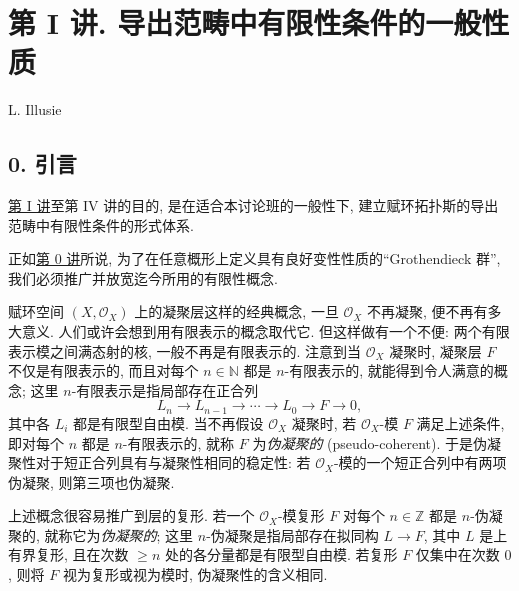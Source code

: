 \providecommand{\sgaIHom}{\underline{\operatorname{Hom}}}
\providecommand{\sgaIRHom}{\mathrm R\!\underline{\operatorname{Hom}}}
\providecommand{\sgaIGRHom}{\mathrm R\!\operatorname{Hom}}
\providecommand{\sgaIExt}{\underline{\operatorname{Ext}}}
\providecommand{\sgaIParff}{\underline{\mathrm{parf}}}
\providecommand{\sgaIS}{\underline S}
\providecommand{\otL}{\mathop{\otimes}^{\mathrm L}}
\section*{第 I 讲. 导出范畴中有限性条件的一般性质}
\begin{center}
L. Illusie
\end{center}

\subsection*{0. 引言}
\hyperlink{sga6.e01.expose}{第 I 讲}至第 IV 讲的目的, 是在适合本讨论班的一般性下, 建立赋环拓扑斯的导出范畴中有限性条件的形式体系.

正如\hyperlink{sga6.e00.expose}{第 0 讲}所说, 为了在任意概形上定义具有良好变性性质的“Grothendieck 群”, 我们必须推广并放宽迄今所用的有限性概念.

赋环空间 \((X,\mathcal O_X)\) 上的凝聚层这样的经典概念, 一旦 \(\mathcal O_X\) 不再凝聚, 便不再有多大意义. 人们或许会想到用有限表示的概念取代它. 但这样做有一个不便: 两个有限表示模之间满态射的核, 一般不再是有限表示的. 注意到当 \(\mathcal O_X\) 凝聚时, 凝聚层 \(F\) 不仅是有限表示的, 而且对每个 \(n\in\mathbb N\) 都是 \(n\)-有限表示的, 就能得到令人满意的概念; 这里 \(n\)-有限表示是指局部存在正合列
\[
  L_n\longrightarrow L_{n-1}\longrightarrow \cdots \longrightarrow L_0\longrightarrow F\longrightarrow 0,
\]
其中各 \(L_i\) 都是有限型自由模. 当不再假设 \(\mathcal O_X\) 凝聚时, 若 \(\mathcal O_X\)-模 \(F\) 满足上述条件, 即对每个 \(n\) 都是 \(n\)-有限表示的, 就称 \(F\) 为\emph{伪凝聚的} (pseudo-coherent). 于是伪凝聚性对于短正合列具有与凝聚性相同的稳定性: 若 \(\mathcal O_X\)-模的一个短正合列中有两项伪凝聚, 则第三项也伪凝聚.

上述概念很容易推广到层的复形. 若一个 \(\mathcal O_X\)-模复形 \(F\) 对每个 \(n\in\mathbb Z\) 都是 \(n\)-伪凝聚的, 就称它为\emph{伪凝聚的}; 这里 \(n\)-伪凝聚是指局部存在拟同构 \(L\to F\), 其中 \(L\) 是上有界复形, 且在次数 \(\geq n\) 处的各分量都是有限型自由模. 若复形 \(F\) 仅集中在次数 \(0\), 则将 \(F\) 视为复形或视为模时, 伪凝聚性的含义相同.

